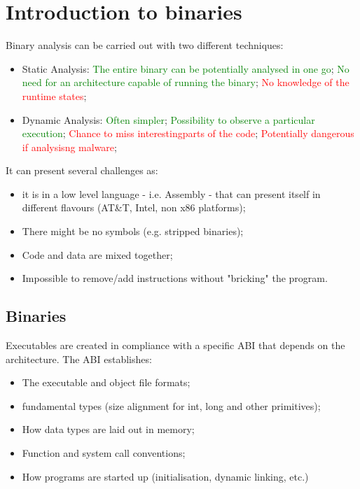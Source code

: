 \chapter{Introduction to binaries}
Binary analysis can be carried out with two different techniques:
\begin{itemize} 
    \item Static Analysis: 
        \subitem \textcolor{green}{The entire binary can be potentially analysed in one go}; 
        \subitem\textcolor{green}{No need for an architecture capable of running the binary};
        \subitem \textcolor{red}{No knowledge of the runtime states};
    \item Dynamic Analysis: \subitem \textcolor{green}{Often simpler};
        \subitem \textcolor{green}{Possibility to observe a particular execution};
        \subitem \textcolor{red}{Chance to miss interestingparts of the code}; 
        \subitem \textcolor{red}{Potentially dangerous if analysisng malware}; 
        \end{itemize} 
It can present several challenges as: 
\begin{itemize} 
    \item it is in a low level language - i.e. Assembly - that can present itself in different flavours 
    (AT\&T, Intel, non x86 platforms); 
    \item There might be no symbols (e.g.  stripped binaries);
    \item Code and data are mixed together; 
    \item Impossible to remove/add instructions without "bricking" the program. 
\end{itemize} 
\section{Binaries} 
Executables are created in compliance with a specific ABI that depends on the architecture. The ABI establishes: 
\begin{itemize} 
    \item The executable and object file formats;
    \item fundamental types (size alignment for int, long and other primitives);
    \item How data types are laid out in memory;
    \item Function and system call conventions;
    \item How programs are started up (initialisation, dynamic linking, etc.) 
\end{itemize}
